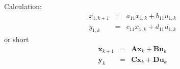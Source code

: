 Calculation:
\begin{eqnarray*}
	x_{1,k+1} &=& a_{11} x_{1,k} + b_{11} u_{1,k}\\
	y_{1,k} &=& c_{11} x_{1,k} + d_{11} u_{1,k}
\end{eqnarray*}
or short
\begin{eqnarray*}
	\mathbf{x}_{k+1} &=& \mathbf{A} \mathbf{x}_k + \mathbf{B} \mathbf{u}_k\\
	\mathbf{y}_k &=& \mathbf{C} \mathbf{x}_k + \mathbf{D} \mathbf{u}_k
	\end{eqnarray*}


